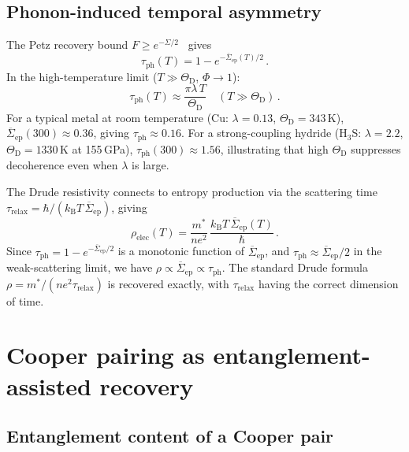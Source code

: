 \documentclass[prb,twocolumn,superscriptaddress,longbibliography,floatfix]{revtex4-2}
\newcommand{\kB}{k_{\mathrm{B}}}
\newcommand{\tauasym}{\tau}
\newcommand{\taudec}{\tauasym_{\mathrm{ph}}}
\newcommand{\ThetaD}{\Theta_{\mathrm{D}}}
\begin{document}
\subsection{Phonon-induced temporal asymmetry}

The Petz recovery bound $F \geq e^{-\Sigma/2}$~\cite{Junge2018,Fawzi2015}
gives
\begin{equation}\label{eq:tau_phonon}
  \taudec(T) = 1 - e^{-\overline{\Sigma}_{\mathrm{ep}}(T)/2}\,.
\end{equation}
In the high-temperature limit ($T \gg \ThetaD$, $\Phi \to 1$):
\begin{equation}\label{eq:tau_highT}
  \taudec(T) \approx \frac{\pi\lambda\, T}{\ThetaD}
  \quad (T \gg \ThetaD)\,.
\end{equation}
For a typical metal at room temperature (Cu: $\lambda = 0.13$,
$\ThetaD = 343\,$K), $\overline{\Sigma}_{\mathrm{ep}}(300) \approx 0.36$,
giving $\taudec \approx 0.16$.  For a strong-coupling hydride
(H$_3$S: $\lambda = 2.2$, $\ThetaD = 1330\,$K at 155\,GPa),
$\taudec(300) \approx 1.56$, illustrating that high $\ThetaD$
suppresses decoherence even when $\lambda$ is large.

The Drude resistivity connects to entropy production via
the scattering time $\tau_{\mathrm{relax}} = \hbar/(\kB T\,
\overline{\Sigma}_{\mathrm{ep}})$, giving
\begin{equation}\label{eq:drude}
  \rho_{\mathrm{elec}}(T) = \frac{m^*}{n e^2}\,
  \frac{\kB T\, \overline{\Sigma}_{\mathrm{ep}}(T)}{\hbar}\,.
\end{equation}
Since $\taudec = 1 - e^{-\overline{\Sigma}_{\mathrm{ep}}/2}$
is a monotonic function of $\overline{\Sigma}_{\mathrm{ep}}$,
and $\taudec \approx \overline{\Sigma}_{\mathrm{ep}}/2$ in the
weak-scattering limit, we have
$\rho \propto \overline{\Sigma}_{\mathrm{ep}} \propto \taudec$.
The standard Drude formula $\rho = m^*/(ne^2\tau_{\mathrm{relax}})$
is recovered exactly, with $\tau_{\mathrm{relax}}$ having the
correct dimension of time.

\section{Cooper pairing as entanglement-assisted recovery}
\label{sec:cooper}

\subsection{Entanglement content of a Cooper pair}
\end{document}
